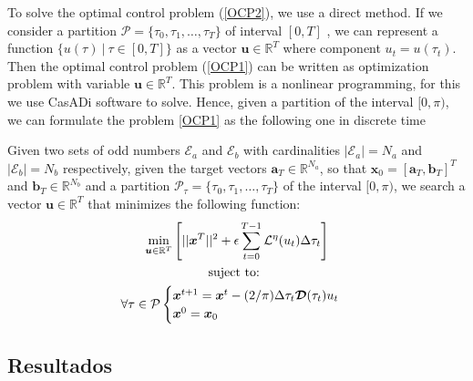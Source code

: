 To solve the optimal control problem (\ref{OCP2}), we use a direct method. 
%
If we consider a partition $\mathcal{P} = \{\tau_0,\tau_1,\dots,\tau_{T}\}$ of interval $[0,T]$ , we can represent a function $\{ u(\tau) \ | \ \tau \in [0,T]\}$ as a vector $\bm{u} \in \mathbb{R}^{T}$ where component $u_t = u(\tau_t)$. 
%
Then the optimal control problem (\ref{OCP1}) can be written as optimization problem with variable $\bm{u} \in \mathbb{R}^{T}$. This problem is a nonlinear programming, for this we use CasADi software to solve. 
%
Hence, given a partition of the interval $[0,\pi)$, we can formulate the problem \eqref{OCP1} as the following one in discrete time

\begin{problem}
Given two sets of odd numbers $\mathcal{E}_a$ and $\mathcal{E}_b$ with cardinalities $|\mathcal{E}_a| = N_a$ and $|\mathcal{E}_b| = N_b$ respectively, given the target vectors $\bm{a}_T  \in \mathbb{R}^{N_a}$, so that $\bm{x}_0 = [\bm{a}_T,\bm{b}_T]^T$ and $\bm{b}_T \in \mathbb{R}^{N_b}$ and a partition $\mathcal{P}_\tau = \{\tau_0,\tau_1,\dots,\tau_{T}\}$ of the interval $[0,\pi)$, we search a vector $\bm{u} \in \mathbb{R}^{T}$ that minimizes the following function:
\begin{gather}
        \min_{\bm{u} \in \mathbb{R}^{T} } 
        \Bigg[ 
        || \bm{x}^{T}||^2
        + \epsilon  \sum_{t=0}^{T-1} \mathcal{L}^\eta(u_{t}) \Delta\tau_t  \Bigg]  \\
        \notag \text{suject to: } \\
        \forall \tau \in \mathcal{P} \begin{cases}
            \bm{x}^{t+1} = \bm{x}^{t} - (2/\pi)\Delta \tau_t \bm{\mathcal{D}}(\tau_t)u_t \\
            \bm{x}^0 = \bm{x}_0
        \end{cases} 
\end{gather}
\end{problem}

\subsection{Resultados}

